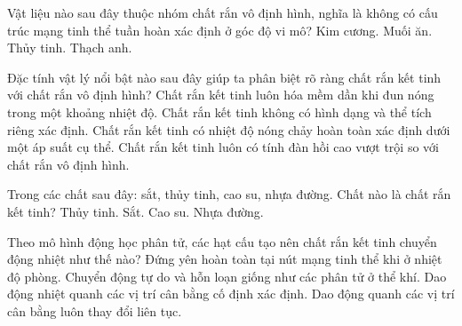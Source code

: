 \begin{ex}
	Vật liệu nào sau đây thuộc nhóm chất rắn vô định hình, nghĩa là không có cấu trúc mạng tinh thể tuần hoàn xác định ở góc độ vi mô?
	\choice
	{Kim cương.}
	{Muối ăn.}
	{\True Thủy tinh.}
	{Thạch anh.}
\end{ex}

\begin{ex}
	Đặc tính vật lý nổi bật nào sau đây giúp ta phân biệt rõ ràng chất rắn kết tinh với chất rắn vô định hình?
	\choice
	{Chất rắn kết tinh luôn hóa mềm dần khi đun nóng trong một khoảng nhiệt độ.}
	{Chất rắn kết tinh không có hình dạng và thể tích riêng xác định.}
	{\True Chất rắn kết tinh có nhiệt độ nóng chảy hoàn toàn xác định dưới một áp suất cụ thể.}
	{Chất rắn kết tinh luôn có tính đàn hồi cao vượt trội so với chất rắn vô định hình.}
\end{ex}

\begin{ex}
	Trong các chất sau đây: sắt, thủy tinh, cao su, nhựa đường. Chất nào là chất rắn kết tinh?
	\choice
	{Thủy tinh.}
	{\True Sắt.}
	{Cao su.}
	{Nhựa đường.}
\end{ex}

\begin{ex}
	Theo mô hình động học phân tử, các hạt cấu tạo nên chất rắn kết tinh chuyển động nhiệt như thế nào?
	\choice
	{Đứng yên hoàn toàn tại nút mạng tinh thể khi ở nhiệt độ phòng.}
	{Chuyển động tự do và hỗn loạn giống như các phân tử ở thể khí.}
	{\True Dao động nhiệt quanh các vị trí cân bằng cố định xác định.}
	{Dao động quanh các vị trí cân bằng luôn thay đổi liên tục.}
\end{ex}

